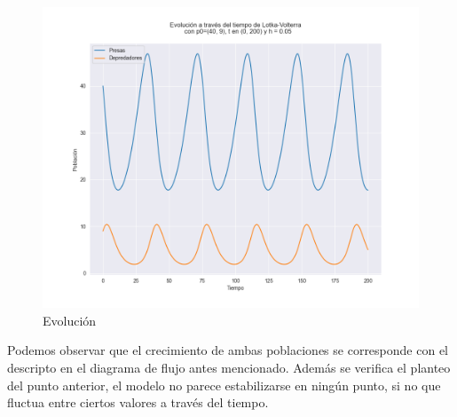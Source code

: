 \documentclass{article}
\begin{document}
\begin{figure}[H]
  \includegraphics[width=\linewidth]{./diagramas/evolucion.png}
  \caption{Evolución}
\end{figure}

Podemos observar que el crecimiento de ambas poblaciones se corresponde con el descripto en el diagrama de flujo antes mencionado. Además se verifica el planteo del punto anterior, el modelo no parece estabilizarse en ningún punto, si no que fluctua entre ciertos valores a través del tiempo.
\end{document}
